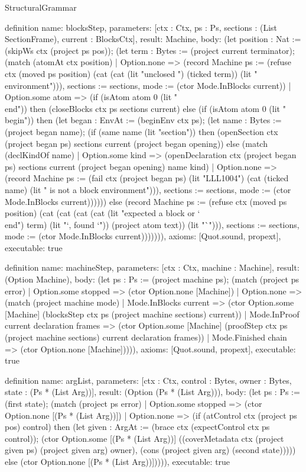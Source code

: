 \begin{lexlean}{StructuralGrammar}
\begin{semanticmodule}
{{definition{
  name: blocksStep,
  parameters: [ctx : Ctx, ps : Ps, sections : (List SectionFrame), current : BlocksCtx],
  result: Machine,
  body: (let position : Nat := (skipWs ctx (project ps pos)); (let term : Bytes := (project current terminator); (match (atomAt ctx position)
    | Option.none => (record Machine {ps := (refuse ctx (moved ps position) (cat (cat (lit "unclosed ") (ticked term)) (lit " environment"))), sections := sections, mode := (ctor Mode.InBlocks current)})
    | Option.some atom => (if (isAtom atom 0 (lit "\\end")) then (closeBlocks ctx ps sections current) else (if (isAtom atom 0 (lit "\\begin")) then (let began : EnvAt := (beginEnv ctx ps); (let name : Bytes := (project began name); (if (same name (lit "section")) then (openSection ctx (project began ps) sections current (project began opening)) else (match (declKindOf name)
      | Option.some kind => (openDeclaration ctx (project began ps) sections current (project began opening) name kind)
      | Option.none => (record Machine {ps := (fail ctx (project began ps) (lit "LLL1004") (cat (ticked name) (lit " is not a block environment"))), sections := sections, mode := (ctor Mode.InBlocks current)}))))) else (record Machine {ps := (refuse ctx (moved ps position) (cat (cat (cat (cat (lit "expected a block or `\\end{") term) (lit "}`, found `")) (project atom text)) (lit "`"))), sections := sections, mode := (ctor Mode.InBlocks current)})))))),
  axioms: [Quot.sound, propext],
  executable: true
}

definition{
  name: machineStep,
  parameters: [ctx : Ctx, machine : Machine],
  result: (Option Machine),
  body: (let ps : Ps := (project machine ps); (match (project ps error)
    | Option.some stopped => (ctor Option.none [Machine])
    | Option.none => (match (project machine mode)
      | Mode.InBlocks current => (ctor Option.some [Machine] (blocksStep ctx ps (project machine sections) current))
      | Mode.InProof current declaration frames => (ctor Option.some [Machine] (proofStep ctx ps (project machine sections) current declaration frames))
      | Mode.Finished chain => (ctor Option.none [Machine])))),
  axioms: [Quot.sound, propext],
  executable: true
}

definition{
  name: argList,
  parameters: [ctx : Ctx, control : Bytes, owner : Bytes, state : (Ps * (List Arg))],
  result: (Option (Ps * (List Arg))),
  body: (let ps : Ps := (first state); (match (project ps error)
    | Option.some stopped => (ctor Option.none [(Ps * (List Arg))])
    | Option.none => (if (atControl ctx (project ps pos) control) then (let given : ArgAt := (brace ctx (expectControl ctx ps control)); (ctor Option.some [(Ps * (List Arg))] ((coverMetadata ctx (project given ps) (project given arg) owner), (cons (project given arg) (second state))))) else (ctor Option.none [(Ps * (List Arg))])))),
  executable: true
}

}}
\end{semanticmodule}
\end{lexlean}
